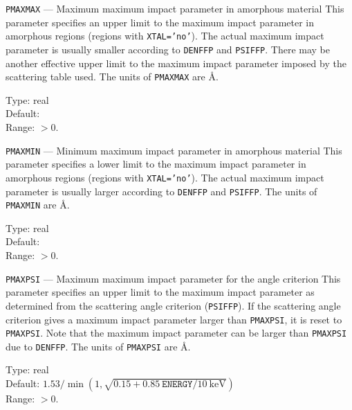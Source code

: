 \begin{keydescription}{\texttt{PMAXMAX} --- Maximum maximum impact
    parameter in amorphous material}
%
  This parameter specifies an upper limit to the maximum impact
  parameter in amorphous regions (regions with \texttt{XTAL='no'}).
  The actual maximum impact parameter is usually smaller according to
  {\tt DENFFP} and \texttt{PSIFFP}.  There may be another effective
  upper limit to the maximum impact parameter imposed by the
  scattering table used.  The units of \texttt{PMAXMAX} are \AA.
  \begin{keytab}
    Type:    \> real \\
    Default:  \\
    Range:   \> $>0$.
  \end{keytab}
\end{keydescription}

\begin{keydescription}{\texttt{PMAXMIN} --- Minimum maximum impact
    parameter in amorphous material}
%
  This parameter specifies a lower limit to the maximum impact
  parameter in amorphous regions (regions with \texttt{XTAL='no'}).
  The actual maximum impact parameter is usually larger according to
  {\tt DENFFP} and \texttt{PSIFFP}.  The units of \texttt{PMAXMIN} are \AA.
  \begin{keytab}
    Type:    \> real \\
    Default:  \\
    Range:   \> $>0$.
  \end{keytab}
\end{keydescription}

\begin{keydescription}{\texttt{PMAXPSI} --- Maximum maximum impact
    parameter for the angle criterion}
%
  This parameter specifies an upper limit to the maximum impact
  parameter as determined from the scattering angle criterion
  (\texttt{PSIFFP}).  If the scattering angle criterion gives a
  maximum impact parameter larger than \texttt{PMAXPSI}, it is reset
  to \texttt{PMAXPSI}. Note that the maximum impact parameter can be
  larger than \texttt{PMAXPSI} due to {\tt DENFFP}. 
  The units of \texttt{PMAXPSI} are \AA.  
  \begin{keytab}
    Type:    \> real \\
    Default: \> $1.53 / \min( 1,
                 \sqrt{0.15+0.85~\texttt{ENERGY}/10~\mathrm{keV}} )$ \\
    Range:   \> $>0$.
  \end{keytab}
\end{keydescription}

